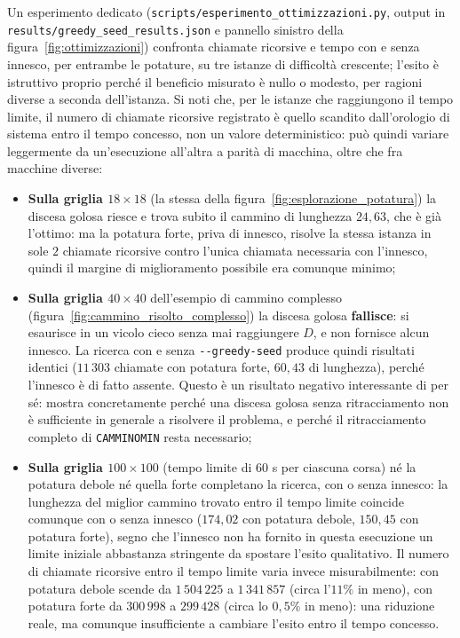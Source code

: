 Un esperimento dedicato (\texttt{scripts/esperimento\_ottimizzazioni.py}, output in \texttt{results/greedy\_seed\_results.json} e pannello sinistro della figura~\ref{fig:ottimizzazioni}) confronta chiamate ricorsive e tempo con e senza innesco, per entrambe le potature, su tre istanze di difficoltà crescente; l'esito è istruttivo proprio perché il beneficio misurato è nullo o modesto, per ragioni diverse a seconda dell'istanza. Si noti che, per le istanze che raggiungono il tempo limite, il numero di chiamate ricorsive registrato è quello scandito dall'orologio di sistema entro il tempo concesso, non un valore deterministico: può quindi variare leggermente da un'esecuzione all'altra a parità di macchina, oltre che fra macchine diverse:
\begin{itemize}
    \item \textbf{Sulla griglia $18\times18$} (la stessa della figura~\ref{fig:esplorazione_potatura}) la discesa golosa riesce e trova subito il cammino di lunghezza $24{,}63$, che è già l'ottimo: ma la potatura forte, priva di innesco, risolve la stessa istanza in sole $2$ chiamate ricorsive contro l'unica chiamata necessaria con l'innesco, quindi il margine di miglioramento possibile era comunque minimo;
    \item \textbf{Sulla griglia $40\times40$} dell'esempio di cammino complesso (figura~\ref{fig:cammino_risolto_complesso}) la discesa golosa \textbf{fallisce}: si esaurisce in un vicolo cieco senza mai raggiungere $D$, e non fornisce alcun innesco. La ricerca con e senza \texttt{-{}-greedy-seed} produce quindi risultati identici ($11\,303$ chiamate con potatura forte, $60{,}43$ di lunghezza), perché l'innesco è di fatto assente. Questo è un risultato negativo interessante di per sé: mostra concretamente perché una discesa golosa senza ritracciamento non è sufficiente in generale a risolvere il problema, e perché il ritracciamento completo di \texttt{CAMMINOMIN} resta necessario;
    \item \textbf{Sulla griglia $100\times100$} (tempo limite di $60$ s per ciascuna corsa) né la potatura debole né quella forte completano la ricerca, con o senza innesco: la lunghezza del miglior cammino trovato entro il tempo limite coincide comunque con o senza innesco ($174{,}02$ con potatura debole, $150{,}45$ con potatura forte), segno che l'innesco non ha fornito in questa esecuzione un limite iniziale abbastanza stringente da spostare l'esito qualitativo. Il numero di chiamate ricorsive entro il tempo limite varia invece misurabilmente: con potatura debole scende da $1\,504\,225$ a $1\,341\,857$ (circa l'$11\%$ in meno), con potatura forte da $300\,998$ a $299\,428$ (circa lo $0{,}5\%$ in meno): una riduzione reale, ma comunque insufficiente a cambiare l'esito entro il tempo concesso.
\end{itemize}
